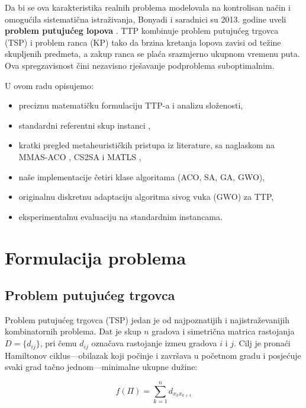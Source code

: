 \documentclass[12pt,a4paper]{article}
\begin{document}
Da bi se ova karakteristika realnih problema modelovala na kontrolisan na\v{c}in i omogu\'{c}ila sistemati\v{c}na istra\v{z}ivanja, Bonyadi i saradnici su 2013. godine uveli \textbf{problem putuju\'{c}eg lopova} \cite{bonyadi2013}. TTP kombinuje problem putuju\'{c}eg trgovca (TSP) i problem ranca (KP) tako da brzina kretanja lopova zavisi od te\v{z}ine skupljenih predmeta, a zakup ranca se pla\'{c}a srazmjerno ukupnom vremenu puta. Ova spreg\nuta zavisnost \v{c}ini nezavisno rje\v{s}avanje podproblema suboptimalnim.

U ovom radu opisujemo:
\begin{itemize}
    \item preciznu matemati\v{c}ku formulaciju TTP-a i analizu složenosti,
    \item standardni referentni skup instanci \cite{polyakovskiy2014},
    \item kratki pregled metaheuristi\v{c}kih pristupa iz literature, sa naglaskom na MMAS-ACO \cite{wagner2016}, CS2SA \cite{yafrani2016} i MATLS \cite{mei2014},
    \item na\v{s}e implementacije \v{c}etiri klase algoritama (ACO, SA, GA, GWO),
    \item originalnu diskretnu adaptaciju algoritma sivog vuka (GWO) za TTP,
    \item eksperimentalnu evaluaciju na standardnim instancama.
\end{itemize}

\section{Formulacija problema}

\subsection{Problem putuju\'{c}eg trgovca}

Problem putuju\'{c}eg trgovca (TSP) jedan je od najpoznatijih i najistra\v{z}evanijih kombinatornih problema. Dat je skup $n$ gradova i simetri\v{c}na matrica rastojanja $D = \{d_{ij}\}$, pri \v{c}emu $d_{ij}$ ozna\v{c}ava rastojanje izme\dj{}u gradova $i$ i $j$. Cilj je prona\'{c}i Hamiltonov ciklus---obilazak koji po\v{c}inje i zavr\v{s}ava u po\v{c}etnom gradu i posje\'{c}uje svaki grad ta\v{c}no jednom---minimalne ukupne du\v{z}ine:

\begin{equation}
    f(\Pi) = \sum_{k=1}^{n} d_{x_k x_{k+1}}
\end{equation}
\end{document}
